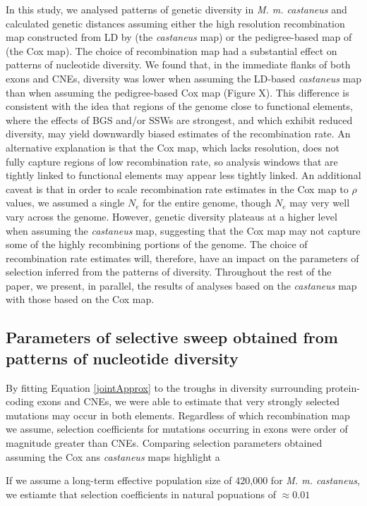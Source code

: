 \documentclass[11pt]{article}
\begin{document}
	In this study, we analysed patterns of genetic diversity in \textit{M. m. castaneus} and calculated genetic distances assuming either the high resolution recombination map constructed from LD by \cite{RN340}(the \textit{castaneus} map) or the pedigree-based map of \cite{RN232} (the Cox map). The choice of recombination map had a substantial effect on patterns of nucleotide diversity. We found that, in the immediate flanks of both exons and CNEs, diversity was lower when assuming the LD-based \textit{castaneus} map than when assuming the pedigree-based Cox map (Figure X). This difference is consistent with the idea that regions of the genome close to functional elements, where the effects of BGS and/or SSWs are strongest, and which exhibit reduced diversity, may yield downwardly biased estimates of the recombination rate. An alternative explanation is that the Cox map, which lacks resolution, does not fully capture regions of low recombination rate, so analysis windows that are tightly linked to functional elements may appear less tightly linked. An additional caveat is that in order to scale  recombination rate estimates in the Cox map to $\rho$ values, we assumed a single $N_e$ for the entire genome, though $N_e$ may very well vary across the genome. However, genetic diversity  plateaus at a higher level when assuming the \textit{castaneus} map, suggesting that the Cox map may not capture some of the highly recombining portions of the genome. The choice of recombination rate estimates will, therefore, have an impact on the parameters of selection inferred from the patterns of diversity. Throughout the rest of the paper, we present, in parallel, the results of analyses based on the \textit{castaneus} map with those based on the Cox map.
	
\subsection*{Parameters of selective sweep obtained from patterns of nucleotide diversity}

	By fitting Equation \ref{jointApprox} to the troughs in diversity surrounding protein-coding exons and CNEs, we were able to estimate that very strongly selected mutations may occur in both elements. Regardless of which recombination map we assume, selection coefficients for mutations occurring in exons were order of magnitude greater than CNEs. Comparing selection parameters obtained assuming the Cox ans \textit{castaneus} maps highlight a 
	
	If we assume a long-term effective population size of 420,000 for \textit{M. m. castaneus}, we estiamte that selection coefficients in natural popuations of $\approx 0.01$
\end{document}
